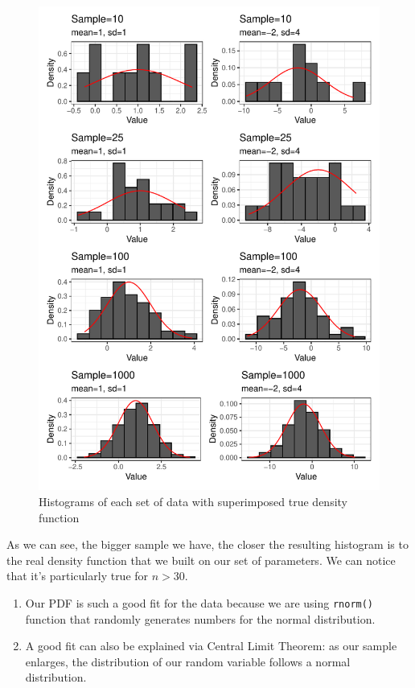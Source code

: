 \documentclass{article}\usepackage[]{graphicx}\usepackage[]{color}
\makeatletter
\def\maxwidth{ %
  \ifdim\Gin@nat@width>\linewidth
    \linewidth
  \else
    \Gin@nat@width
  \fi
}
\newenvironment{knitrout}{}{} %
\makeatother
\begin{document}
\begin{enumerate}
\begin{enumerate}
\begin{figure}[H]
\begin{center}
\begin{knitrout}
\color{fgcolor}
\includegraphics[width=\maxwidth]{figure/unnamed-chunk-5-1} 
\end{knitrout}
	\caption{Histograms of each set of data with superimposed true density function}
\label{plot3} %
\end{center}
\end{figure}
As we can see, the bigger sample we have, the closer the resulting histogram is to the real density function that we built on our set of parameters. We can notice that it's particularly true for $n>30$.\\
\begin{enumerate}
  \item Our PDF is such a good fit for the data because we are using \texttt{rnorm()} function that randomly generates numbers for the normal distribution. 
  \item A good fit can also be explained via Central Limit Theorem: as our sample enlarges, the distribution of our random variable follows a normal distribution.
\end{enumerate}


\end{enumerate}
\end{enumerate}
\end{document}
